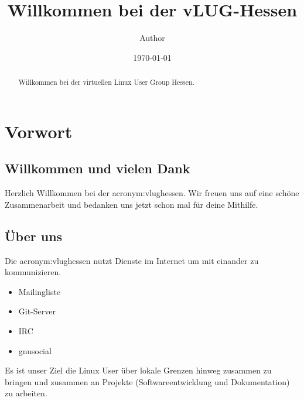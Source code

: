 \documentclass[a4paper,10pt,ngerman,titlepage,twoside]{scrreprt}
\begin{document}
\setcounter{secnumdepth}{0}

\titlehead{vLUG-Hessen - Willkommen} 
\subject{Virtuelle Linux User Group Hessen}
\title{Willkommen bei der vLUG-Hessen}
\author{Author}
\date{\today} 
\publishers{Virtuelle Linux User Group Hessen \\
	\url{http://www.vlug-hessen.de}
}

\maketitle
\tableofcontents
\newpage




\begin{abstract}
Willkommen bei der virtuellen Linux User Group Hessen.
\end{abstract}


\chapter{Vorwort}
\section{Willkommen und vielen Dank}
Herzlich Willkommen bei der \gls{acronym:vlughessen}.  Wir freuen uns auf eine schöne Zusammenarbeit und bedanken uns jetzt schon mal für
deine Mithilfe.
\section{Über uns}
Die \gls{acronym:vlughessen} nutzt Dienste im Internet um mit einander zu kommunizieren.
\begin{itemize}
	\item Mailingliste
	\item Git-Server 
	\item IRC
	\item gnusocial
\end{itemize}
Es ist unser Ziel  die Linux User über lokale Grenzen hinweg zusammen zu bringen und zusammen an Projekte (Softwareentwicklung und Dokumentation) zu arbeiten.
\setcounter{anhangcounter}{\value{page}}
\setcounter{secnumdepth}{10}
\end{document}
